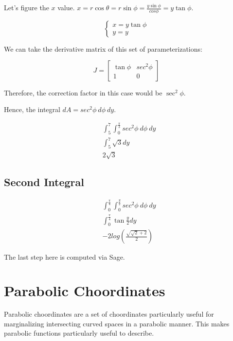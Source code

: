 \documentclass[letterpaper]{article}
\begin{document}
Let's figure the \(x\) value. \(x = r\cos\theta = r \sin\phi = \frac{y\sin\phi}{cos\phi} = y\tan\phi\).

\begin{equation}
\begin{cases}
   x = y\tan\phi\\
   y = y 
\end{cases}
\end{equation}

We can take the derivative matrix of this set of parameterizations:

\begin{equation}
   J = \begin{bmatrix} 
\tan\phi & sec^2\phi \\
1 & 0 
\end{bmatrix} 
\end{equation}

Therefore, the correction factor in this case would be \(\sec^2\phi\).

Hence, the integral \(dA = sec^2\phi\ d\phi\ dy\).

\begin{align}
   &\int_5^7 \int_0^{\frac{\pi}{3}} sec^2\phi\ d\phi\ dy\\
& \int_5^7 \sqrt{3} dy\\
& 2\sqrt{3} 
\end{align}

\subsection{Second Integral}
\label{sec:org5e11060}

\begin{align}
   &\int_0^\frac{\pi}{4} \int_0^{\frac{y}{2}} sec^2\phi\ d\phi\ dy\\
& \int_0^\frac{\pi}{4} \tan\frac{y}{2} dy\\
& -2log\left(\frac{\sqrt{\sqrt{2}+2}}{2}\right)
\end{align}

The last step here is computed via Sage.

\section{Parabolic Choordinates}
\label{sec:orga023f23}
Parabolic choordinates are a set of choordinates particularly useful for marginalizing intersecting curved spaces in a parabolic manner. This makes parabolic functions particularly useful to describe.
\end{document}
